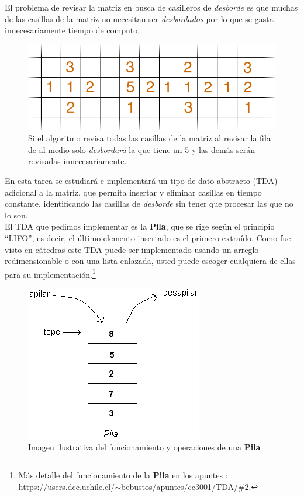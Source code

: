 \documentclass[dcc]{fcfmcourse}
\begin{document}
El problema de revisar la matriz en busca de casilleros de \textit{desborde} es que muchas de las casillas de la matriz no necesitan ser \textit{desbordados} por lo que se gasta innecesariamente tiempo de computo.\\

\begin{figure}[!ht]
    \centering
    \includegraphics[scale=0.4]{imagenes/sandpilelarge.png}
    \caption{Si el algoritmo revisa todas las casillas de la matriz al revisar la fila de al medio solo \textit{desbordará} la que tiene un 5 y las demás serán revisadas innecesariamente.}
\end{figure}

En esta tarea se estudiará e implementará un tipo de dato abstracto (TDA) adicional a la matriz, que permita insertar y eliminar casillas en tiempo constante, identificando las casillas de \textit{desborde} sin tener que procesar las que no lo son.\\ 

El TDA que pedimos implementar es la \textbf{Pila}, que se rige según el principio ``LIFO'', es decir, el último elemento insertado es el primero extraído. Como fue visto en cátedras este TDA puede ser implementado usando un arreglo redimensionable o con una lista enlazada, usted puede escoger cualquiera de ellas para su implementación.\footnote{Más detalle del funcionamiento de la \textbf{Pila} en los apuntes : \\ \href{https://users.dcc.uchile.cl/~bebustos/apuntes/cc3001/TDA/\#2}{https://users.dcc.uchile.cl/$\sim$bebustos/apuntes/cc3001/TDA/\#2}.}
\begin{figure}[!ht]
    \centering
    \includegraphics[scale=0.5]{imagenes/pila.png}
    \caption{Imagen ilustrativa del funcionamiento y operaciones de una \textbf{Pila}}
\end{figure}
\end{document}
